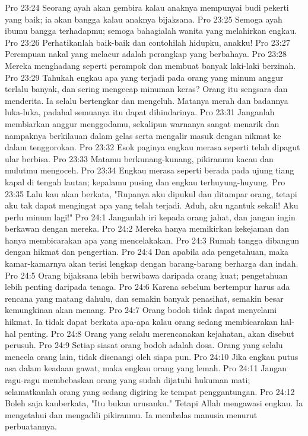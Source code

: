 Pro 23:24  Seorang ayah akan gembira kalau anaknya mempunyai budi pekerti yang baik; ia akan bangga kalau anaknya bijaksana.
Pro 23:25  Semoga ayah ibumu bangga terhadapmu; semoga bahagialah wanita yang melahirkan engkau.
Pro 23:26  Perhatikanlah baik-baik dan contohilah hidupku, anakku!
Pro 23:27  Perempuan nakal yang melacur adalah perangkap yang berbahaya.
Pro 23:28  Mereka menghadang seperti perampok dan membuat banyak laki-laki berzinah.
Pro 23:29  Tahukah engkau apa yang terjadi pada orang yang minum anggur terlalu banyak, dan sering mengecap minuman keras? Orang itu sengsara dan menderita. Ia selalu bertengkar dan mengeluh. Matanya merah dan badannya luka-luka, padahal semuanya itu dapat dihindarinya.
Pro 23:31  Janganlah membiarkan anggur menggodamu, sekalipun warnanya sangat menarik dan nampaknya berkilauan dalam gelas serta mengalir masuk dengan nikmat ke dalam tenggorokan.
Pro 23:32  Esok paginya engkau merasa seperti telah dipagut ular berbisa.
Pro 23:33  Matamu berkunang-kunang, pikiranmu kacau dan mulutmu mengoceh.
Pro 23:34  Engkau merasa seperti berada pada ujung tiang kapal di tengah lautan; kepalamu pusing dan engkau terhuyung-huyung.
Pro 23:35  Lalu kau akan berkata, "Rupanya aku dipukul dan ditampar orang, tetapi aku tak dapat mengingat apa yang telah terjadi. Aduh, aku ngantuk sekali! Aku perlu minum lagi!"
Pro 24:1  Janganlah iri kepada orang jahat, dan jangan ingin berkawan dengan mereka.
Pro 24:2  Mereka hanya memikirkan kekejaman dan hanya membicarakan apa yang mencelakakan.
Pro 24:3  Rumah tangga dibangun dengan hikmat dan pengertian.
Pro 24:4  Dan apabila ada pengetahuan, maka kamar-kamarnya akan terisi lengkap dengan barang-barang berharga dan indah.
Pro 24:5  Orang bijaksana lebih berwibawa daripada orang kuat; pengetahuan lebih penting daripada tenaga.
Pro 24:6  Karena sebelum bertempur harus ada rencana yang matang dahulu, dan semakin banyak penasihat, semakin besar kemungkinan akan menang.
Pro 24:7  Orang bodoh tidak dapat menyelami hikmat. Ia tidak dapat berkata apa-apa kalau orang sedang membicarakan hal-hal penting.
Pro 24:8  Orang yang selalu merencanakan kejahatan, akan disebut perusuh.
Pro 24:9  Setiap siasat orang bodoh adalah dosa. Orang yang selalu mencela orang lain, tidak disenangi oleh siapa pun.
Pro 24:10  Jika engkau putus asa dalam keadaan gawat, maka engkau orang yang lemah.
Pro 24:11  Jangan ragu-ragu membebaskan orang yang sudah dijatuhi hukuman mati; selamatkanlah orang yang sedang digiring ke tempat penggantungan.
Pro 24:12  Boleh saja kauberkata, "Itu bukan urusanku." Tetapi Allah mengawasi engkau. Ia mengetahui dan mengadili pikiranmu. Ia membalas manusia menurut perbuatannya.
